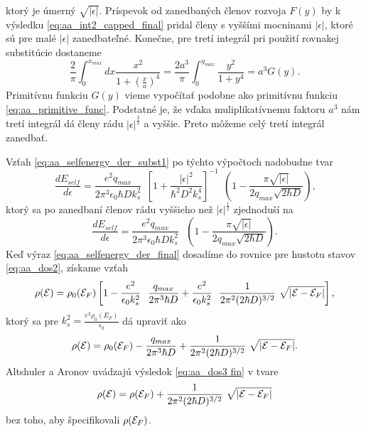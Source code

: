 ktorý je úmerný $\sqrt{|\epsilon|}$. Príspevok od zanedbaných členov rozvoja $F(y)$ by k výsledku \eqref{eq:aa_int2_capped_final} pridal členy s vyššími mocninami $|\epsilon|$, ktoré sú pre malé $|\epsilon|$ zanedbateľné.
Konečne,  pre tretí integrál pri použití rovnakej substitúcie dostaneme
\begin{equation}
 \label{eq:aa_int3}
 \frac{2}{\pi}\int_0^{x_{max}}dx\frac{x^2}{1+(\frac{x}{a})^4} =   \frac{2a^3}{\pi}\int_0^{y_{max}}\frac{y^2}{1+y^4}=a^3G(y) \text{.}
\end{equation}
Primitívnu funkciu $G(y)$ vieme vypočítať podobne ako primitívnu funkciu \eqref{eq:aa_primitive_func}.
Podstatné je, že vďaka muliplikatívnemu faktoru $a^3$ nám tretí integrál dá členy rádu $|\epsilon|^{\frac{3}{2}}$ a vyššie. Preto
môžeme celý tretí integrál zanedbať.

Vzťah \eqref{eq:aa_selfenergy_der_subst1} po týchto výpočtoch nadobudne tvar
\begin{equation}
\label{eq:aa_selfenergy_der_final}
\frac{dE_{self}}{d\epsilon}=
\frac{e^2q_{max}}{2\pi^3 \epsilon_0 \hbar D k_s^{2}}  \ \   \left[1+\frac{|\epsilon|^2}{\hbar^2D^2k_s^4}\right]^{-1} \ \
\left(1- \frac{\pi\sqrt{|\epsilon|}}{2q_{max}\sqrt{2\hbar D }}\right)\text{,}
\end{equation}
ktorý sa po zanedbaní  členov rádu vyššieho  než $|\epsilon|^{\frac{1}{2}}$ zjednoduší na
\begin{equation}
\label{eq:aa_selfenergy_der_final}
\frac{dE_{self}}{d\epsilon}=\frac{e^2q_{max}}{2\pi^3 \epsilon_0 \hbar D k_s^{2}} \ \ \
\left(1- \frac{\pi\sqrt{|\epsilon|}}{2q_{max}\sqrt{2\hbar D}}\right)        \text{.}
\end{equation}
Keď výraz  \eqref{eq:aa_selfenergy_der_final} dosadíme do rovnice pre hustotu stavov \eqref{eq:aa_dos2}, získame vzťah
\begin{equation}
 \label{eq:aa_dos3}
 \rho(\E)=\rho_0(\E_F)\left[1-\frac{e^{2}}{\epsilon_0 k_s^{2}}\ \  \frac{q_{max}}{2\pi^3 \hbar D}
 +  \frac{e^{2}}{\epsilon_0 k_s^{2}} \ \ \frac{1}{2\pi^2 (2\hbar D)^{3/2}}  \ \sqrt{|\E-\E_F|}  \right]\text{,}
\end{equation}
ktorý sa pre $k_s^2=\frac{e^2 \rho_0(E_F)}{\epsilon_0}$ dá upraviť ako
\begin{equation}
 \label{eq:aa_dos3 fin}
 \rho(\E)=\rho_0(\E_F) - \frac{q_{max}}{2\pi^3 \hbar D}
 +    \frac{1}{2\pi^2 (2\hbar D)^{3/2}}  \ \sqrt{|\E-\E_F|}  \text{.}
\end{equation}
Altshuler a Aronov uvádzajú výsledok \eqref{eq:aa_dos3 fin} v tvare
\begin{equation}
 \label{eq:aa_dos_final}
 \rho(\E)=\rho(\E_F)+ \frac{1}{2\pi^2 (2\hbar D)^{3/2}}  \ \sqrt{|\E-\E_F|}\text{}
\end{equation}
bez toho, aby špecifikovali $\rho(\mathcal{E}_F)$.



